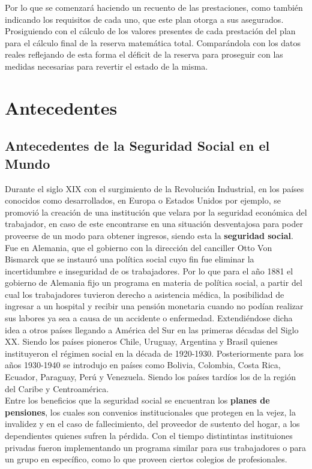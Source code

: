 \documentclass[12pt,letterpaper,titlepage]{article}
\begin{document}
{Por lo que se comenzará haciendo un recuento de las prestaciones, como también indicando los requisitos de cada uno, que este plan otorga a sus asegurados. Prosiguiendo con el cálculo de los valores presentes de cada prestación del plan para el cálculo final de la reserva matemática total. Comparándola con los datos reales reflejando de esta forma el déficit de la reserva para proseguir con las medidas necesarias para revertir el estado de la misma. \bigskip

\newpage
\section{Antecedentes}

\subsection{Antecedentes de la Seguridad Social en el Mundo}

Durante el siglo XIX con el surgimiento de la Revolución Industrial, en los países conocidos como desarrollados, en Europa o Estados Unidos por ejemplo,  se promovió la creación de una institución que velara por la seguridad económica del trabajador, en caso de este encontrarse en una situación desventajosa para poder proveerse de un modo para obtener ingresos, siendo esta la \textbf{seguridad social}. Fue en Alemania, que el gobierno con la dirección del canciller Otto Von Bismarck que se instauró una política social cuyo fin fue eliminar la incertidumbre e inseguridad de os trabajadores. Por lo que para el año 1881 el gobierno de Alemania fijo un programa en materia de política social, a partir del cual los trabajadores tuvieron derecho a asistencia médica, la posibilidad de ingresar a un hospital y recibir una pensión monetaria cuando no podían realizar sus labores ya sea a causa de un accidente o enfermedad. Extendiéndose dicha idea a otros países llegando a América del Sur en las primeras décadas del Siglo XX. Siendo los países pioneros Chile, Uruguay, Argentina y Brasil quienes instituyeron el régimen social en la década de 1920-1930. Posteriormente para los años 1930-1940 se introdujo en países como Bolivia, Colombia, Costa Rica, Ecuador, Paraguay, Perú y Venezuela. Siendo los países tardíos los de la región del Caribe y Centroamérica.\\

Entre los beneficios que la seguridad social se encuentran los \textbf{planes de pensiones}, los cuales son convenios institucionales que protegen en la vejez, la invalidez y en el caso de fallecimiento, del proveedor de sustento del hogar, a los dependientes quienes sufren la pérdida. Con el tiempo distintintas instituiones privadas fueron implementando un programa similar para sus trabajadores o para un grupo en específico, como lo que proveen ciertos colegios de profesionales. 

}
\end{document}
